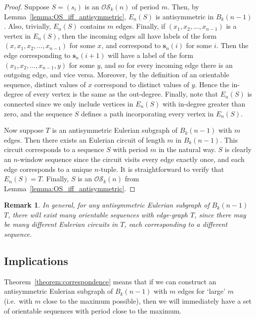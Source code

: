 \documentclass[a4paper,11pt]{article}
\newtheorem{remark}[lemma]{Remark}
\begin{document}
\begin{proof}
Suppose $S=(s_i)$ is an $\mathcal{OS}_k(n)$ of period $m$.  Then, by
Lemma~\ref{lemma:OS_iff_antisymmetric}, $E_n(S)$ is antisymmetric in $B_{k}(n-1)$.  Also,
trivially, $E_n(S)$ contains $m$ edges.  Finally, if $(x_1,x_2,\ldots,x_{n-1})$ is a vertex in
$E_n(S)$, then the incoming edges all have labels of the form $(x,x_1,x_2,\ldots,x_{n-1})$ for
some
$x$, and correspond to $\mathbf{s}_n(i)$ for some $i$.  Then the edge corresponding to
$\mathbf{s}_n(i+1)$ will have a label of the form $(x_1,x_2,\ldots,x_{n-1},y)$ for some $y$, and
so
for every incoming edge there is an outgoing edge, and vice versa.  Moreover, by the definition of
an orientable sequence, distinct values of $x$ correspond to distinct values of $y$. Hence the
in-degree of every vertex is the same as the out-degree.  Finally, note that $E_n(S)$ is connected
since we only include vertices in $E_n(S)$ with in-degree greater than zero, and the sequence $S$
defines a path incorporating every vertex in $E_n(S)$.

Now suppose $T$ is an antisymmetric Eulerian subgraph of $B_{k}(n-1)$ with $m$ edges.  Then there
exists an Eulerian circuit of length $m$ in $B_{k}(n-1)$.  This circuit corresponds to a sequence
$S$ with period $m$ in the natural way.  $S$ is clearly an $n$-window sequence since the circuit
visits every edge exactly once, and each edge corresponds to a unique $n$-tuple.  It is
straightforward to verify that $E_n(S)=T$. Finally, $S$ is an $\mathcal{OS}_k(n)$ from
Lemma~\ref{lemma:OS_iff_antisymmetric}.
\end{proof}

\begin{remark}
In general, for any antisymmetric Eulerian subgraph of $B_{k}(n-1)$ $T$, there will exist many
orientable sequences with edge-graph $T$, since there may be many different Eulerian circuits in
$T$, each corresponding to a different sequence.
\end{remark}

\subsection{Implications}

Theorem~\ref{theorem:correspondence} means that if we can construct an antisymmetric Eulerian
subgraph of $B_{k}(n-1)$ with $m$ edges for `large' $m$ (i.e.\ with $m$ close to the maximum
possible), then we will immediately have a set of orientable sequences with period close to the
maximum.
\end{document}
